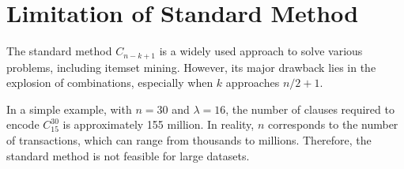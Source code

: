\section{Limitation of Standard Method}
The standard method $C_{n-k+1}$ is a widely used approach to solve various problems, including itemset mining.
However, its major drawback lies in the explosion of combinations,
especially when $k$ approaches $n / 2 + 1$.

In a simple example, with $n = 30$ and $\lambda = 16$,
the number of clauses required to encode $C_{15}^{30}$ is approximately 155 million.
In reality, $n$ corresponds to the number of transactions, which can range from thousands to millions.
Therefore, the standard method is not feasible for large datasets.